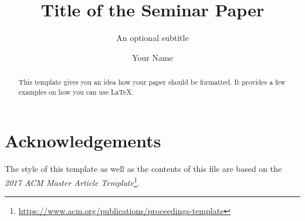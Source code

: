 \documentclass[sigconf,natbib=false]{acmart}
\begin{document}

\title{Title of the Seminar Paper}
\subtitle{An optional subtitle}

\author{Your Name}


\begin{abstract}
This template gives you an idea how your paper should be formatted. It provides
a few examples on how you can use \LaTeX.
\end{abstract}



\maketitle


\section{Acknowledgements}
The style of this template as well as the contents of this file are based on the
\textit{2017 ACM Master Article
Template}\footnote{\url{https://www.acm.org/publications/proceedings-template}}.
 


%

\printbibliography
\end{document}
